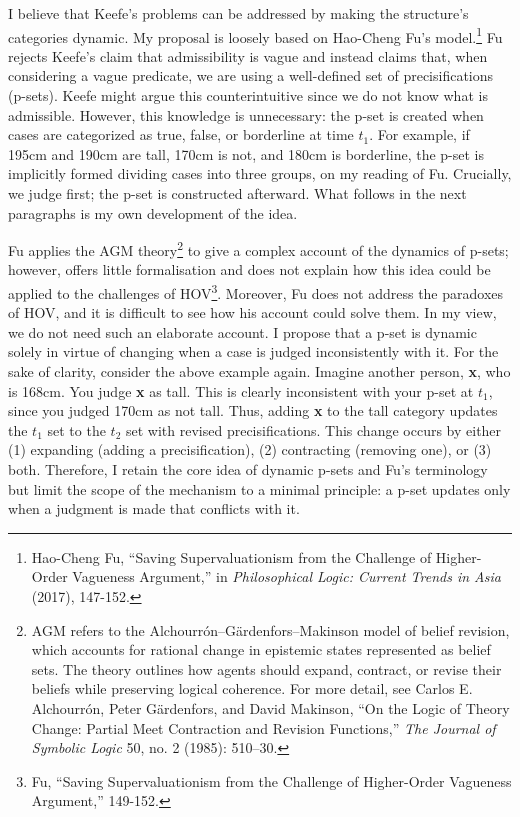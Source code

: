 I believe that Keefe's problems can be addressed by making the
structure's categories dynamic. My proposal is loosely based on
Hao-Cheng Fu's model.\footnote{Hao-Cheng Fu, ``Saving Supervaluationism
  from the Challenge of Higher-Order Vagueness Argument,'' in
  \emph{Philosophical Logic: Current Trends in Asia} (2017), 147-152.} Fu rejects Keefe's
claim that admissibility is vague and instead claims that, when
considering a vague predicate, we are using a well-defined set of
precisifications (p-sets). Keefe might argue this counterintuitive since
we do not know what is admissible. However, this knowledge is
unnecessary: the p-set is created when cases are categorized as true,
false, or borderline at time \(t_{1}\). For example, if 195cm and 190cm
are tall, 170cm is not, and 180cm is borderline, the p-set is implicitly
formed dividing cases into three groups, on my reading of Fu. Crucially,
we judge first; the p-set is constructed afterward. What follows in the
next paragraphs is my own development of the idea.

Fu applies the AGM theory\footnote{AGM refers to the
  Alchourrón--Gärdenfors--Makinson model of belief revision, which
  accounts for rational change in epistemic states represented as belief
  sets. The theory outlines how agents should expand, contract, or
  revise their beliefs while preserving logical coherence. For more
  detail, see Carlos E. Alchourrón, Peter Gärdenfors, and David
  Makinson, ``On the Logic of Theory Change: Partial Meet Contraction
  and Revision Functions,'' \emph{The Journal of Symbolic Logic} 50, no.
  2 (1985): 510--30.}
to give a complex account of the dynamics of p-sets; however, offers
little formalisation and does not explain how this idea could be applied
to the challenges of HOV\footnote{Fu, ``Saving Supervaluationism from
  the Challenge of Higher-Order Vagueness Argument,'' 149-152.}.
Moreover, Fu does not address the paradoxes of HOV, and it is difficult
to see how his account could solve them. In my view, we do not need such
an elaborate account. I propose that a p-set is dynamic solely in virtue
of changing when a case is judged inconsistently with it. For the sake
of clarity, consider the above example again. Imagine another person,
\textbf{x}, who is 168cm. You judge \textbf{x} as tall. This is clearly
inconsistent with your p-set at \(t_{1}\), since you judged 170cm as not
tall. Thus, adding \textbf{x} to the tall category updates the \(t_{1}\)
set to the \(t_{2}\) set with revised precisifications. This change
occurs by either (1) expanding (adding a precisification), (2)
contracting (removing one), or (3) both. Therefore, I retain the core
idea of dynamic p-sets and Fu's terminology but limit the scope of the
mechanism to a minimal principle: a p-set updates only when a judgment
is made that conflicts with it.

